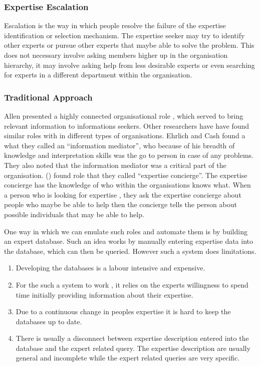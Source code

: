 \documentclass[a4paper,oneside,11pt]{report}
\begin{document}
\subsubsection{Expertise Escalation} 
Escalation is the way in which people resolve the failure of the expertise identification or selection mechanism. The expertise seeker may try to identify other experts or pursue other experts that maybe able to solve the problem.  This does not necessary involve asking members higher up in the organisation hierarchy, it may involve asking help from less desirable experts or even searching for experts in a different department within the organisation\autocite{mcdonalackerman1998}.

\subsubsection{Traditional Approach}
Allen presented a highly connected organisational role , which served to bring relevant information to informations seekers. Other researchers have have found similar roles with in different types of organisations. Ehrlich and Cash found a what they called an \enquote{information mediator}, who because of his breadth of knowledge and interpretation skills was the go to person in case of any problems. They also noted that the information mediator was a critical part of the organisation. \citeauthor{mcdonalackerman1998} (\citeyear{mcdonalackerman1998}) found role that they called \enquote{expertise concierge}. The expertise concierge has the knowledge of who within the organisations knows what. When a person who is looking for expertise , they ask the expertise concierge about people who maybe be able to help then the concierge tells the person about possible individuals that may be able to help. 

One way in which we can emulate such roles and automate them is by building an expert database. Such an idea works by manually entering expertise data into the database, which can then be queried. However such a system does limitations.
\begin{enumerate}
	\item Developing the databases is a labour intensive and expensive.
	\item For the such a system to work , it relies on the experts willingness to spend time 		  			  initially providing information about their expertise.
	\item Due to a continuous change in peoples expertise it is hard to keep the databases up to 				  date.
	\item There is usually a disconnect between expertise description entered into the database and 	          the expert related query. The expertise description are usually general and incomplete                                                                            		  while the expert related queries are very specific. 
\end{enumerate}\autocite{kobsaseid2003}
\end{document}
